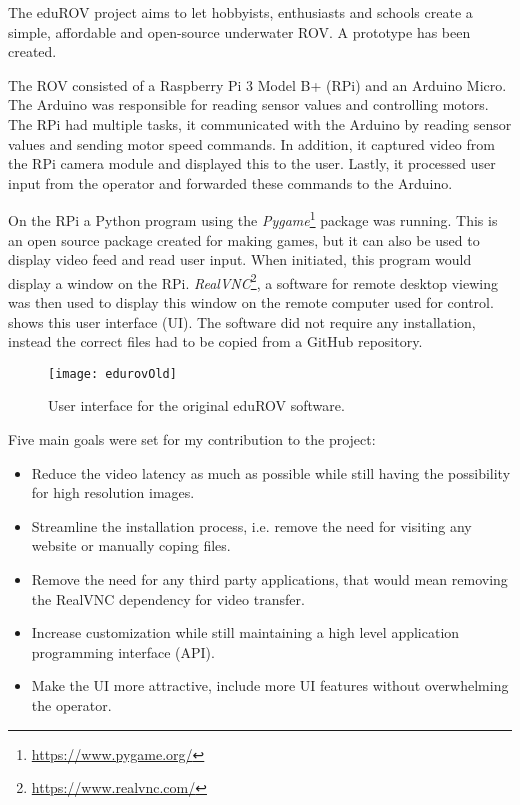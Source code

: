 The eduROV project aims to let hobbyists, enthusiasts and schools create a simple, affordable and open-source underwater ROV. A prototype has been created.

The ROV consisted of a Raspberry Pi 3 Model B+ (RPi) and an Arduino Micro. The Arduino was responsible for reading sensor values and controlling motors. The RPi had multiple tasks, it communicated with the Arduino by reading sensor values and sending motor speed commands. In addition, it captured video from the RPi camera module and displayed this to the user. Lastly, it processed user input from the operator and forwarded these commands to the Arduino.

On the RPi a Python program using the \emph{Pygame}\footnote{\url{https://www.pygame.org/}} package was running. This is an open source package created for making games, but it can also be used to display video feed and read user input. When initiated, this program would display a window on the RPi. \emph{RealVNC}\footnote{\url{https://www.realvnc.com/}}, a software for remote desktop viewing was then used to display this window on the remote computer used for control.  shows this user interface (UI). The software did not require any installation, instead the correct files had to be copied from a GitHub repository.

\begin{figure}[h!]
    \centering
    \texttt{[image: edurovOld]}
    \caption{User interface for the original eduROV software.}
    \label{edurovOld}
\end{figure}

Five main goals were set for my contribution to the project:

\begin{itemize}
\item Reduce the video latency as much as possible while still having the possibility for high resolution images.

\item Streamline the installation process, i.e. remove the need for visiting any website or manually coping files.

\item Remove the need for any third party applications, that would mean removing the RealVNC dependency for video transfer.

\item Increase customization while still maintaining a high level application programming interface (API).

\item Make the UI more attractive, include more UI features without overwhelming the operator.
\end{itemize}

